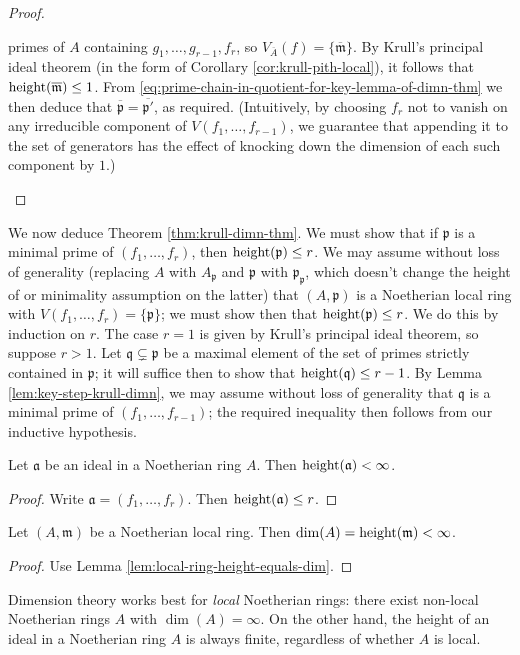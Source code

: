 \documentclass[10pt]{article}
\begin{document}
\begin{proof}
\begin{enumerate}
    primes of $A$ containing $g_1,\dotsc,g_{r-1},f_r$, so
    $V_{\overline{A}}(f)
    = \{\overline{\mathfrak{m}}\}$.    
    By Krull's principal
    ideal theorem (in the form of Corollary \ref{cor:krull-pith-local}),
    it follows that $\operatorname{height}(\overline{\mathfrak{m} }) \leq 1$.
    From
    \eqref{eq:prime-chain-in-quotient-for-key-lemma-of-dimn-thm}
    we then deduce that $\overline{\mathfrak{p} } =
    \overline{\mathfrak{p}'}$,
    as required.
    (Intuitively, by choosing $f_r$ not to vanish on any irreducible component
    of $V(f_1,\dotsc,f_{r-1})$,
    we guarantee that appending it to the set of generators has the effect
    of knocking down the dimension of each such component by $1$.)
  \end{enumerate}
\end{proof}

We now deduce Theorem \ref{thm:krull-dimn-thm}.  We must show
that if \(\mathfrak{p}\) is a minimal prime of \((f_1,\dotsc,f_r)\),
then \(\operatorname{height}(\mathfrak{p}) \leq r\).  We may assume without loss
of generality (replacing \(A\) with \(A_\mathfrak{p}\) and
\(\mathfrak{p}\) with \(\mathfrak{p}_\mathfrak{p}\), which doesn't
change the height of or minimality assumption on the latter)
that \((A,\mathfrak{p})\) is a Noetherian local ring with
\(V(f_1,\dotsc,f_r) = \{\mathfrak{p}\}\); we must show then that
\(\operatorname{height}(\mathfrak{p}) \leq r\).  We do this by induction on \(r\).
The case \(r = 1\) is given by Krull's principal ideal theorem, so
suppose \(r > 1\).  Let \(\mathfrak{q} \subsetneq \mathfrak{p}\) be
a maximal element of the set of primes strictly contained in
\(\mathfrak{p}\); it will suffice then to show that
\(\operatorname{height}(\mathfrak{q}) \leq r-1\).  By Lemma
\ref{lem:key-step-krull-dimn}, we may assume without loss of
generality that \(\mathfrak{q}\) is a minimal prime of
\((f_1,\dotsc,f_{r-1})\); the required inequality then follows from our
inductive hypothesis.

\begin{corollary}
  Let $\mathfrak{a}$ be an ideal in a Noetherian ring $A$.
  Then $\operatorname{height}(\mathfrak{a}) < \infty$.
\end{corollary}
\begin{proof}
  Write $\mathfrak{a} = (f_1,\dotsc,f_r)$.
  Then $\operatorname{height}(\mathfrak{a}) \leq r$.
\end{proof}
\begin{corollary}
  Let $(A,\mathfrak{m})$ be a Noetherian local ring.
  Then $\dim(A) = \operatorname{height}(\mathfrak{m}) < \infty$.
\end{corollary}
\begin{proof}
Use Lemma \ref{lem:local-ring-height-equals-dim}.
\end{proof}
\begin{remark}
  Dimension theory works best for \emph{local} Noetherian rings:
  there exist non-local Noetherian rings $A$ with
  $\dim(A) = \infty$.  On the other hand, the height of an ideal
  in a Noetherian ring $A$ is always finite, regardless of
  whether $A$ is local.
\end{remark}
\end{document}
